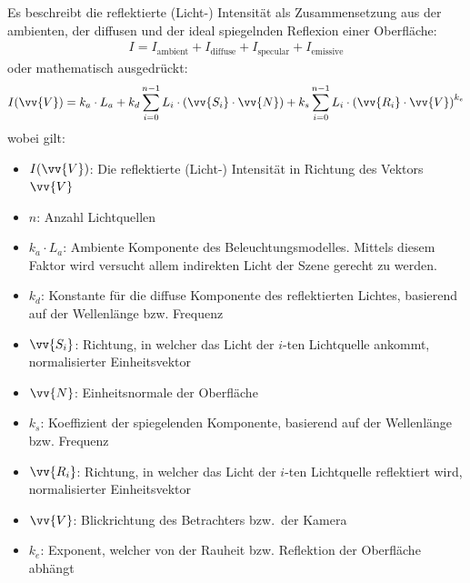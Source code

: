 Es beschreibt die reflektierte (Licht-) Intensität als Zusammensetzung aus der ambienten, der diffusen und der ideal spiegelnden Reflexion einer Oberfläche:
\begin{gather}
    I = I_{\text{ambient}} + I_{\text{diffuse}} + I_{\text{specular}} + I_{\text{emissive}}
\end{gather}
oder mathematisch ausgedrückt:
\begin{gather}
    I(\vv{V}) = k_{a} \cdot L_{a} +
                k_{d} \displaystyle\sum_{i=0}^{n - 1} L_{i} \cdot (\vv{S_{i}} \cdot \vv{N}) +
                k_{s} \displaystyle\sum_{i=0}^{n - 1} L_{i} \cdot {(\vv{R_{i}} \cdot \vv{V})}^{k_{e}}
\end{gather}
wobei gilt:
\begin{itemize}
    \item $I(\vv{V})$:              Die reflektierte (Licht-) Intensität in Richtung des Vektors $\vv{V}$
    \item $n$:                      Anzahl Lichtquellen
    \item $k_{a} \cdot L_{a}$:      Ambiente Komponente des
                                    Beleuchtungsmodelles. Mittels diesem Faktor
                                    wird versucht allem indirekten Licht der
                                    Szene gerecht zu werden.
    \item $k_{d}$:                  Konstante für die diffuse Komponente des
                                    reflektierten Lichtes, basierend auf der
                                    Wellenlänge bzw. Frequenz
    \item $\vv{S_{i}}$:             Richtung, in welcher das Licht der $i$-ten
                                    Lichtquelle ankommt, normalisierter
                                    Einheitsvektor
    \item $\vv{N}$:                 Einheitsnormale der Oberfläche
    \item $k_{s}$:                  Koeffizient der spiegelenden Komponente,
                                    basierend auf der Wellenlänge bzw. Frequenz
    \item $\vv{R_{i}}$:             Richtung, in welcher das Licht der $i$-ten
                                    Lichtquelle reflektiert wird,
                                    normalisierter Einheitsvektor
    \item $\vv{V}$:                 Blickrichtung des Betrachters bzw.\ der
                                    Kamera
    \item $k_{e}$:                  Exponent, welcher von der Rauheit bzw.
                                    Reflektion der Oberfläche abhängt
\end{itemize}



